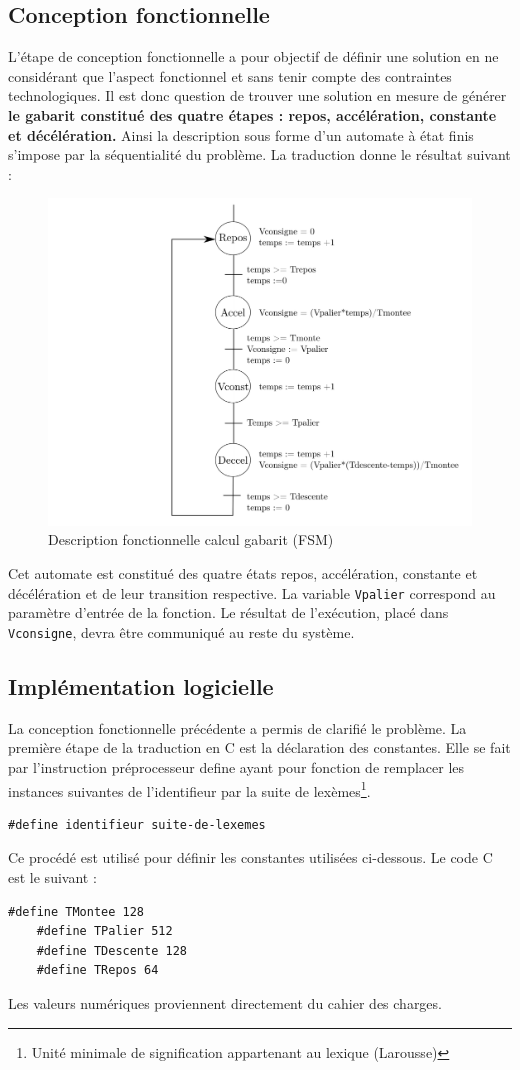 \documentclass[a4paper]{article}
\begin{document}
	\subsection{Conception fonctionnelle}
	L'étape de conception fonctionnelle a pour objectif de définir une solution en ne considérant que l'aspect fonctionnel et sans tenir compte des contraintes technologiques. Il est donc question de trouver une solution en mesure de générer \textbf{le gabarit constitué des quatre étapes : repos, accélération, constante et décélération.} Ainsi la description sous forme d'un automate à état finis s'impose par la séquentialité du problème. La traduction donne le résultat suivant :
	\begin{figure}[H]
		\centering
		\includegraphics[width=0.76\linewidth]{calcul_gabarit_FSM}
		\caption{Description fonctionnelle calcul gabarit (FSM)}
		\label{fig:FSM}
	\end{figure}
	Cet automate est constitué des quatre états repos, accélération, constante et décélération et de leur transition respective. La variable \texttt{Vpalier} correspond au paramètre d'entrée de la fonction. Le résultat de l'exécution, placé dans \texttt{Vconsigne}, devra être communiqué au reste du système. 

	\newpage
	
	\subsection{Implémentation logicielle}
	La conception fonctionnelle précédente a permis de clarifié le problème. La première étape de la traduction en C est la déclaration des constantes. Elle se fait par l'instruction préprocesseur define ayant pour fonction de remplacer les instances suivantes de l'identifieur par la suite de lexèmes\footnote{Unité minimale de signification appartenant au lexique (Larousse)}. \cite{KRBook}
	\begin{lstlisting}[style=CStyle] 
	#define identifieur suite-de-lexemes \end{lstlisting}
	Ce procédé est utilisé pour définir les constantes utilisées ci-dessous. Le code C est le suivant :
	\begin{lstlisting}[style=CStyle] 
	#define TMontee 128
	#define TPalier 512
	#define TDescente 128
	#define TRepos 64\end{lstlisting}
	Les valeurs numériques proviennent directement du cahier des charges.
	
\end{document}
